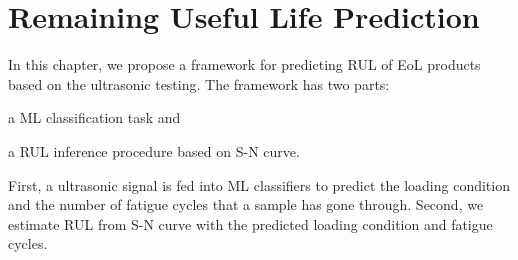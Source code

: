\chapter{Remaining Useful Life Prediction}
\label{chap: rul}

In this chapter, we propose a framework for predicting RUL of EoL products based on the ultrasonic testing. The framework has two parts: \begin{enumerate*}[label=\itshape\alph*\upshape)]
    \item a ML classification task and
    \item a RUL inference procedure based on S-N curve.
\end{enumerate*}  First, a ultrasonic signal is fed into ML classifiers to predict the loading condition and the number of fatigue cycles that a sample has gone through. Second, we estimate RUL from S-N curve with the predicted loading condition and fatigue cycles.